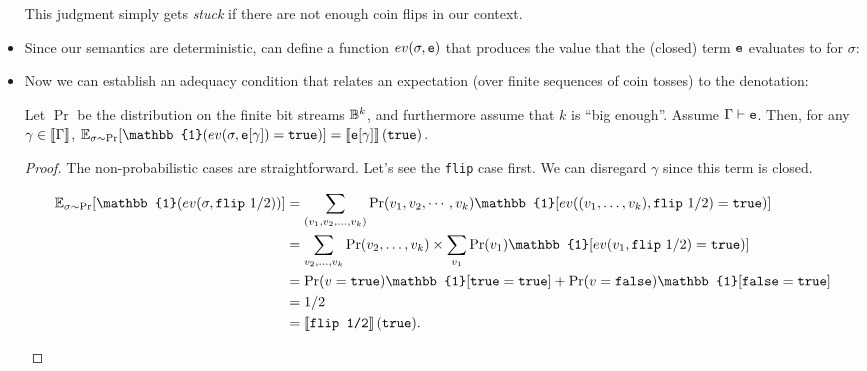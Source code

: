 \documentclass{tufte-handout}
\begin{document}
\begin{itemize}

  This judgment simply gets \emph{stuck} if there are not enough coin flips in
  our context.

  \item Since our semantics are deterministic, can define a function $ev(\sigma,
  \texttt{e})$ that produces the value that the (closed) term $\texttt{e}$ evaluates to for
  $\sigma$:


  \item Now we can establish an adequacy condition that relates an expectation 
  (over finite sequences of coin tosses) to the denotation:
  
  \begin{theorem}
  Let $\Pr$ be the distribution on the finite bit streams $\mathbb{B}^k$, and furthermore assume 
  that $k$ is ``big enough''. Assume
  $\Gamma \vdash \texttt{e}$.  Then, for any $\gamma \in \left \llbracket {\Gamma} \right \rrbracket$,
  $\E_{\sigma \sim \Pr}[\mathbb{1}(ev(\sigma, \te[\gamma]) = \true)] =
  \dbracket{\te[\gamma]}(\true)$.
  \end{theorem}
  \begin{proof}
  The non-probabilistic cases are straightforward. Let's see the \texttt{flip} 
  case first. We can disregard $\gamma$ since this term is closed.
  \begin{fullwidth}
  \begin{align*}
    \E_{\sigma \sim \Pr}[\mathbb{1}(ev(\sigma, \texttt{flip}~1/2))] &= 
    \sum_{(v_1, v_2, \dots, v_k)} \Pr(v_1, v_2, \cdots, v_k) \mathbb{1}[ev((v_1, \dots, v_k), \texttt{flip}~1/2) = \true)] \\ 
    &= \sum_{v_2, \dots, v_k} \Pr(v_2, \dots, v_k) \times \sum_{v_1} \Pr(v_1) \mathbb{1}[ev(v_1, \texttt{flip}~1/2) = \true)] \\ 
    &= \Pr(v = \true) \mathbb{1}[\true = \true] + \Pr(v = \false)\mathbb{1}[\false = \true] \\ 
    &= 1/2  \\
    &= \dbracket{\texttt{flip~1/2}}(\true).
  \end{align*}
  \end{fullwidth}


\end{proof}
\end{itemize}
\end{document}
